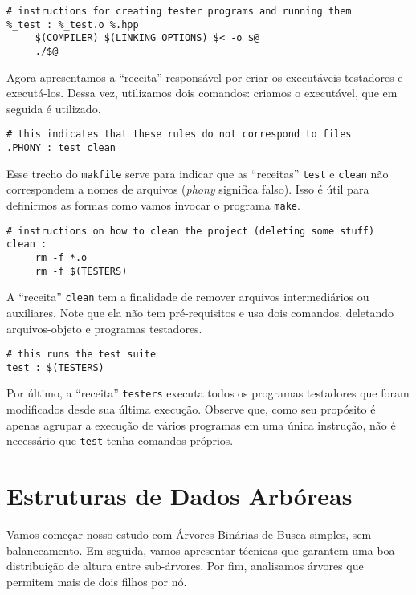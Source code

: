 \documentclass[11pt]{article}
\begin{document}
\begin{verbatim}
# instructions for creating tester programs and running them
%_test : %_test.o %.hpp
     $(COMPILER) $(LINKING_OPTIONS) $< -o $@
     ./$@
\end{verbatim}

Agora apresentamos a ``receita'' responsável por criar os
executáveis testadores e executá-los.  Dessa vez, utilizamos dois
comandos: criamos o executável, que em seguida é utilizado.

\begin{verbatim}
# this indicates that these rules do not correspond to files
.PHONY : test clean
\end{verbatim}

Esse trecho do \texttt{makfile} serve para indicar que as
``receitas'' \texttt{test} e \texttt{clean} não correspondem a
nomes de arquivos (\emph{phony} significa falso).  Isso é útil para
definirmos as formas como vamos invocar o programa \texttt{make}.

\begin{verbatim}
# instructions on how to clean the project (deleting some stuff)
clean :
     rm -f *.o
     rm -f $(TESTERS)
\end{verbatim}

A ``receita'' \texttt{clean} tem a finalidade de remover arquivos
intermediários ou auxiliares.  Note que ela não tem pré-requisitos
e usa dois comandos, deletando arquivos-objeto e programas
testadores.

\begin{verbatim}
# this runs the test suite
test : $(TESTERS)
\end{verbatim}

Por último, a ``receita'' \texttt{testers} executa todos os
programas testadores que foram modificados desde sua última
execução.  Observe que, como seu propósito é apenas agrupar a
execução de vários programas em uma única instrução, não é
necessário que \texttt{test} tenha comandos próprios.

\pagebreak

\section{Estruturas de Dados Arbóreas}
\label{sec:org9625186}

Vamos começar nosso estudo com Árvores Binárias de Busca simples,
sem balanceamento.  Em seguida, vamos apresentar técnicas que
garantem uma boa distribuição de altura entre sub-árvores.  Por fim,
analisamos árvores que permitem mais de dois filhos por nó.
\end{document}
